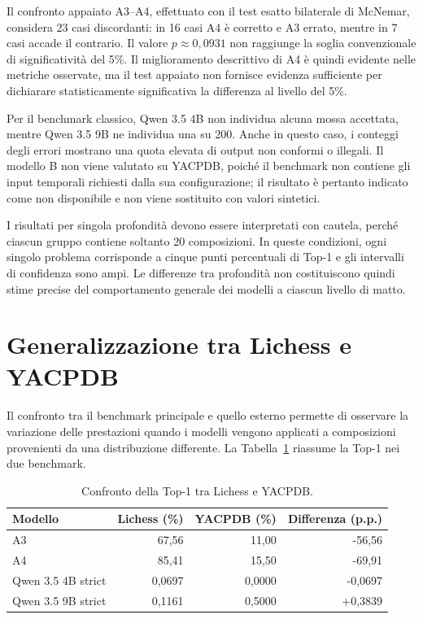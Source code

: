 Il confronto appaiato A3--A4, effettuato con il test esatto bilaterale di McNemar, considera 23 casi discordanti: in 16 casi A4 è corretto e A3 errato, mentre in 7 casi accade il contrario. Il valore \(p \approx 0{,}0931\) non raggiunge la soglia convenzionale di significatività del 5\%. Il miglioramento descrittivo di A4 è quindi evidente nelle metriche osservate, ma il test appaiato non fornisce evidenza sufficiente per dichiarare statisticamente significativa la differenza al livello del 5\%.

Per il benchmark classico, Qwen 3.5 4B non individua alcuna mossa accettata, mentre Qwen 3.5 9B ne individua una su 200. Anche in questo caso, i conteggi degli errori mostrano una quota elevata di output non conformi o illegali. Il modello B non viene valutato su YACPDB, poiché il benchmark non contiene gli input temporali richiesti dalla sua configurazione; il risultato è pertanto indicato come non disponibile e non viene sostituito con valori sintetici.

I risultati per singola profondità devono essere interpretati con cautela, perché ciascun gruppo contiene soltanto 20 composizioni. In queste condizioni, ogni singolo problema corrisponde a cinque punti percentuali di Top-1 e gli intervalli di confidenza sono ampi. Le differenze tra profondità non costituiscono quindi stime precise del comportamento generale dei modelli a ciascun livello di matto.

\section{Generalizzazione tra Lichess e YACPDB}

Il confronto tra il benchmark principale e quello esterno permette di osservare la variazione delle prestazioni quando i modelli vengono applicati a composizioni provenienti da una distribuzione differente. La Tabella~\ref{tab:generalization-results} riassume la Top-1 nei due benchmark.

\begin{table}[htbp]
    \centering
    \small
    \caption{Confronto della Top-1 tra Lichess e YACPDB.}
    \label{tab:generalization-results}
    \begin{tabular}{lrrr}
        \toprule
        Modello & Lichess (\%) & YACPDB (\%) & Differenza (p.p.) \\
        \midrule
        A3 & 67,56 & 11,00 & -56,56 \\
        A4 & 85,41 & 15,50 & -69,91 \\
        Qwen 3.5 4B strict & 0,0697 & 0,0000 & -0,0697 \\
        Qwen 3.5 9B strict & 0,1161 & 0,5000 & +0,3839 \\
        \bottomrule
    \end{tabular}
\end{table}


